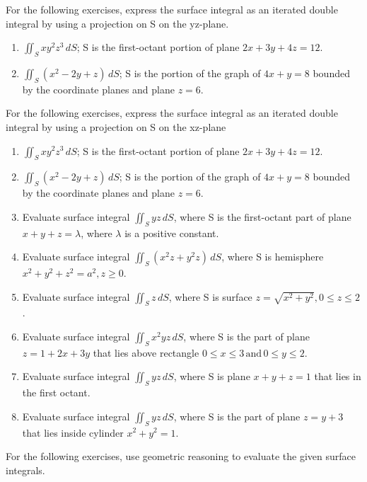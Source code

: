 \documentclass{exercises}
\begin{document}
For the following exercises, express the surface integral as an iterated double integral by using a projection on S on the yz-plane.

\begin{enumerate}[resume]
\item $\iint_{S}xy^{2}z^{3}\,dS$; S is the first-octant portion of plane $2x+3y+4z=12$.
\item $\iint_{S}(x^{2}-2y+z)\,dS$; S is the portion of the graph of $4x+y=8$ bounded by the coordinate planes and plane $z=6$.
\end{enumerate}

For the following exercises, express the surface integral as an iterated double integral by using a projection on S on the xz-plane

\begin{enumerate}[resume]
\item $\iint_{S}xy^{2}z^{3}\,dS$; S is the first-octant portion of plane $2x+3y+4z=12$.
\item $\iint_{S}(x^{2}-2y+z)\,dS$; S is the portion of the graph of $4x+y=8$ bounded by the coordinate planes and plane $z=6$.
\item Evaluate surface integral $\iint_{S}yz\,dS$, where S is the first-octant part of plane $x+y+z=\lambda$, where $\lambda$ is a positive constant.
\item Evaluate surface integral $\iint_{S}(x^{2}z+y^{2}z)\,dS$, where S is hemisphere $x^{2}+y^{2}+z^{2}=a^{2},z\ge0$.
\item Evaluate surface integral $\iint_{S}z\,dS$, where S is surface $z=\sqrt{x^{2}+y^{2}},0\le z\le2$.
\item Evaluate surface integral $\iint_{S}x^{2}yz\,dS$, where S is the part of plane $z=1+2x+3y$ that lies above rectangle $0\le x\le3\,\text{and}\,0\le y\le2$.
\item Evaluate surface integral $\iint_{S}yz\,dS$, where S is plane $x+y+z=1$ that lies in the first octant.
\item Evaluate surface integral $\iint_{S}yz\,dS$, where S is the part of plane $z=y+3$ that lies inside cylinder $x^{2}+y^{2}=1$.
\end{enumerate}

For the following exercises, use geometric reasoning to evaluate the given surface integrals.
\end{document}
